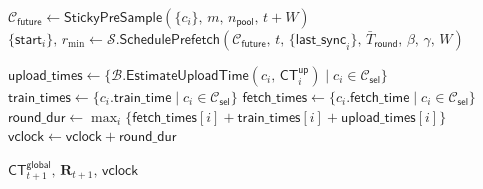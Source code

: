 \begin{algorithm}[t]
\BlankLine
{}
$\mathcal{C}_{\textsf{future}} \gets \textsf{StickyPreSample}(\{c_i\},\, m,\, n_{\textsf{pool}},\, t + W)$\;
$\{\textsf{start}_i\},\, r_{\min} \gets \mathcal{S}.\textsf{SchedulePrefetch}(\mathcal{C}_{\textsf{future}},\, t,\, \{\textsf{last\_sync}_i\},\, \bar{T}_{\textsf{round}},\, \beta,\, \gamma,\, W)$\;


\BlankLine
{}

\BlankLine
{}
$\textsf{upload\_times} \gets \{\mathcal{B}.\textsf{EstimateUploadTime}(c_i,\, \mathsf{CT}_i^{\textsf{up}}) \mid c_i \in \mathcal{C}_{\textsf{sel}}\}$\;
$\textsf{train\_times} \gets \{c_i.\textsf{train\_time} \mid c_i \in \mathcal{C}_{\textsf{sel}}\}$\;
$\textsf{fetch\_times} \gets \{c_i.\textsf{fetch\_time} \mid c_i \in \mathcal{C}_{\textsf{sel}}\}$\;
$\textsf{round\_dur} \gets \max_i \{\textsf{fetch\_times}[i] + \textsf{train\_times}[i] + \textsf{upload\_times}[i]\}$\;
$\textsf{vclock} \gets \textsf{vclock} + \textsf{round\_dur}$\;

\Return $\mathsf{CT}_{t+1}^{\mathsf{global}},\, \mathbf{R}_{t+1},\, \textsf{vclock}$\;
\end{algorithm}
